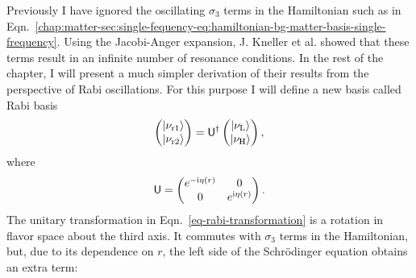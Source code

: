 Previously I have ignored the oscillating $\sigma_3$ terms in the Hamiltonian such as in Eqn.~\ref{chap:matter-sec:single-fequency-eq:hamiltonian-bg-matter-basis-single-frequency}. Using the Jacobi-Anger expansion, J. Kneller et al. showed that these terms result in an infinite number of resonance conditions. In the rest of the chapter, I will present a much simpler derivation of their results from the perspective of Rabi oscillations. For this purpose I will define a new basis called Rabi basis
\begin{equation}
\begin{pmatrix} \ket{\nu_{\mathrm{r1}}}\\ \ket{\nu_{\mathrm{r2}}} \end{pmatrix} =  \mathsf{U}^\dagger \begin{pmatrix} \ket{\nu_{\mathrm{L}}} \\ \ket{\nu_{\mathrm{H}}} \end{pmatrix},
\label{eq-rabi-basis}
\end{equation}
where 
\begin{equation}
\mathsf{U} =  \begin{pmatrix} e^{-\ri \eta (r)} & 0 \\  0 & e^{\mathrm i \eta (r)}  \end{pmatrix}.
\label{eq-rabi-transformation}
\end{equation}
The unitary transformation in Eqn.~\ref{eq-rabi-transformation} is a rotation in flavor space about the third axis.
It commutes with $\sigma_3$ terms in the Hamiltonian, but, due to its dependence on $r$, the left side of the Schr\"{o}dinger equation obtains an extra term:
